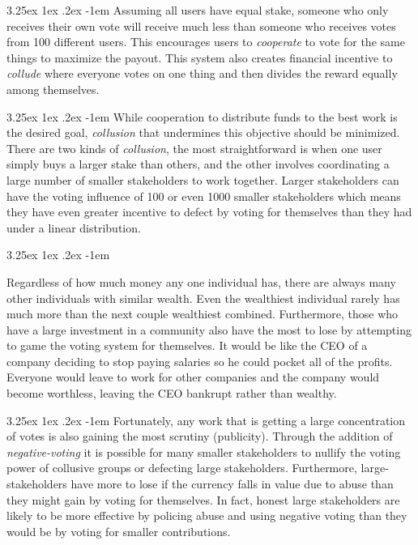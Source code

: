 \documentclass{article}
\makeatletter
\newcounter{subsubsubsection}[subsubsection]
\renewcommand\paragraph{\@startsection{paragraph}{5}{\z@}%
  {3.25ex \@plus1ex \@minus.2ex}%
  {-1em}%
  {\normalfont\normalsize\bfseries}}
\makeatother
\begin{document}
                \paragraph{}
                    Assuming all users have equal stake, someone who only receives their own vote will receive much less than someone who receives votes from 100 different users. This encourages users to \textit{cooperate} to vote for the same things to maximize the payout. This system also creates financial incentive to \textit{collude} where everyone votes on one thing and then divides the reward equally among themselves.


                    \paragraph{}
                        While cooperation to distribute funds to the best work is the desired goal, \textit{collusion} that undermines this objective should be minimized. There are two kinds of \textit{collusion}, the most straightforward is when one user simply buys a larger stake than others, and the other involves coordinating a large number of smaller stakeholders to work together. Larger stakeholders can have the voting influence of 100 or even 1000 smaller stakeholders which means they have even greater incentive to defect by voting for themselves than they had under a linear distribution.

                    \paragraph{}

                        Regardless of how much money any one individual has, there are always many other individuals with similar wealth. Even the wealthiest individual rarely has much more than the next couple wealthiest combined. Furthermore, those who have a large investment in a community also have the most to lose by attempting to game the voting system for themselves. It would be like the CEO of a company deciding to stop paying salaries so he could pocket all of the profits. Everyone would leave to work for other companies and the company would become worthless, leaving the CEO bankrupt rather than wealthy.

                    \paragraph{}
                        Fortunately, any work that is getting a large concentration of votes is also gaining the most scrutiny (publicity). Through the addition of \textit{negative-voting} it is possible for many smaller stakeholders to nullify the voting power of collusive groups or defecting large stakeholders. Furthermore, large-stakeholders have more to lose if the currency falls in value due to abuse than they might gain by voting for themselves. In fact, honest large stakeholders are likely to be more effective by policing abuse and using negative voting than they would be by voting for smaller contributions.
\end{document}
